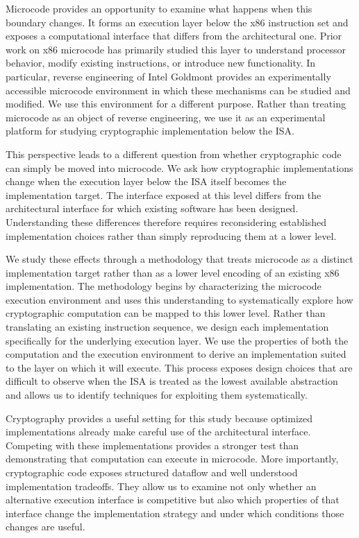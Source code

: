 \documentclass[journal=tches,submission]{iacrtrans}
\begin{document}
Microcode provides an opportunity to examine what happens when this boundary changes.
It forms an execution layer below the x86 instruction set and exposes a computational interface that differs from the architectural one.
Prior work on x86 microcode has primarily studied this layer to understand processor behavior, modify existing instructions, or introduce new functionality.
In particular, reverse engineering of Intel Goldmont provides an experimentally accessible microcode environment in which these mechanisms can be studied and modified.
We use this environment for a different purpose.
Rather than treating microcode as an object of reverse engineering, we use it as an experimental platform for studying cryptographic implementation below the ISA.

This perspective leads to a different question from whether cryptographic code can simply be moved into microcode.
We ask how cryptographic implementations change when the execution layer below the ISA itself becomes the implementation target.
The interface exposed at this level differs from the architectural interface for which existing software has been designed.
Understanding these differences therefore requires reconsidering established implementation choices rather than simply reproducing them at a lower level.

We study these effects through a methodology that treats microcode as a distinct implementation target rather than as a lower level encoding of an existing x86 implementation.
The methodology begins by characterizing the microcode execution environment and uses this understanding to systematically explore how cryptographic computation can be mapped to this lower level.
Rather than translating an existing instruction sequence, we design each implementation specifically for the underlying execution layer.
We use the properties of both the computation and the execution environment to derive an implementation suited to the layer on which it will execute. 
This process exposes design choices that are difficult to observe when the ISA is treated as the lowest available abstraction and allows us to identify techniques for exploiting them systematically. 

Cryptography provides a useful setting for this study because optimized implementations already make careful use of the architectural interface.
Competing with these implementations provides a stronger test than demonstrating that computation can execute in microcode.
More importantly, cryptographic code exposes structured dataflow and well understood implementation tradeoffs.
They allow us to examine not only whether an alternative execution interface is competitive but also which properties of that interface change the implementation strategy and under which conditions those changes are useful.
\end{document}
